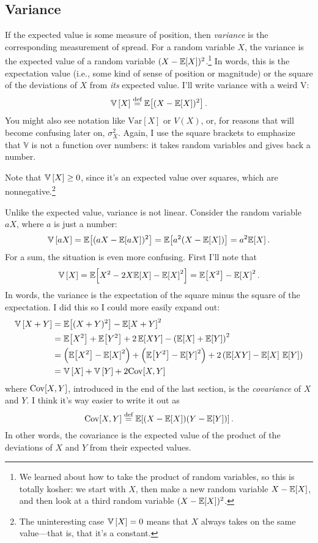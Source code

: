 \subsection{Variance}

If the expected value is some measure of position, then \emph{variance} is the
corresponding measurement of spread. For a random variable $X$, the variance
is the expected value of a random variable $(X - \mathbb{E}\!\left[{X}\right])^2$.\footnote{We
learned about how to take the product of random variables, so this is totally
kosher: we start with $X$, then make a new random variable $X - \mathbb{E}\!\left[{X}\right]$,
and then look at a third random variable $(X - \mathbb{E}\!\left[{X}\right])^2$.} In words, this
is the expectation value (i.e., some kind of sense of position or magnitude)
or the square of the deviations of $X$ from \emph{its} expected value. I'll
write variance with a weird V:
\begin{equation}
\mathbb{V}\left[{X}\right] \stackrel{\text{def}}{=} \mathbb{E}\!\left[{(X - \mathbb{E}\!\left[{X}\right])^2}\right].
\end{equation}
You might also see notation like $\mathrm{Var}[X]$ or $V(X)$, or, for reasons
that will become confusing later on, $\sigma^2_X$. Again, I use the square brackets
to emphasize that $\mathbb{V}$ is not a function over numbers: it takes random
variables and gives back a number.

Note that $\mathbb{V}\left[{X}\right] \geq 0$, since it's an expected value over squares, which
are nonnegative.\footnote{The uninteresting case $\mathbb{V}\left[{X}\right] = 0$ means that $X$
always takes on the same value---that is, that it's a constant.}

Unlike the expected value, variance is not linear. Consider the random variable $aX$,
where $a$ is just a number:
\begin{equation}
\mathbb{V}\left[{aX}\right] = \mathbb{E}\!\left[{(aX - \mathbb{E}\!\left[{aX}\right])^2}\right] = \mathbb{E}\!\left[{a^2(X - \mathbb{E}\!\left[{X}\right])}\right] = a^2 \mathbb{E}\!\left[{X}\right].
\end{equation}
For a sum, the situation is even more confusing. First I'll note that
\begin{equation}
\mathbb{V}\left[{X}\right] = \mathbb{E}\!\left[{X^2 - 2X \mathbb{E}\!\left[{X}\right] - \mathbb{E}\!\left[{X}\right]^2}\right]
  = \mathbb{E}\!\left[{X^2}\right] - \mathbb{E}\!\left[{X}\right]^2.
\end{equation}
In words, the variance is the expectation of the square minus the square of
the expectation. I did this so I could more easily expand out:
\begin{align*}
\var{X + Y} &= \expect{(X+Y)^2} - \expect{X+Y}^2 \\
  &= \expect{X^2} + \expect{Y^2} + 2\, \expect{XY} - \left(\expect{X}+\expect{Y}\right)^2 \\
  &= \left(\expect{X^2} - \expect{X}^2\right) +
    \left(\expect{Y^2} - \expect{Y}^2\right) +
    2 \left(\expect{XY} - \expect{X} \, \expect{Y}\right) \\
  &= \var{X} + \var{Y} + 2 \cov{X, Y}
\end{align*}
where $\mathrm{Cov}\!\left[{X, Y}\right]$, introduced in the end of the last section, is the
\emph{covariance} of $X$ and $Y$. I think it's way easier to write it out as
\begin{equation}
\mathrm{Cov}\!\left[{X, Y}\right] \stackrel{\text{def}}{=} \mathbb{E}\!\left[{(X - \mathbb{E}\!\left[{X}\right])(Y - \mathbb{E}\!\left[{Y}\right])}\right].
\end{equation}
In other words, the covariance is the expected value of the product of the
deviations of $X$ and $Y$ from their expected values.

